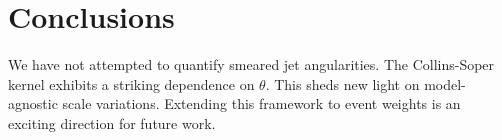 \section{Conclusions}\label{sec:conclusions}

We have not attempted to quantify smeared jet angularities. The
Collins-Soper kernel exhibits a striking dependence on $\theta$. This
sheds new light on model-agnostic scale variations. Extending this
framework to event weights is an exciting direction for future work.

